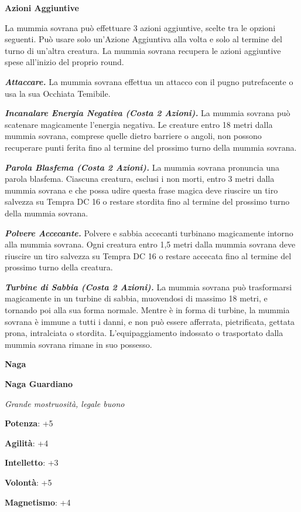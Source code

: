 \begin{multicols}{2}
\textbf{Azioni Aggiuntive}

La mummia sovrana può effettuare 3 azioni aggiuntive, scelte tra le
opzioni seguenti. Può usare solo un'Azione Aggiuntiva alla volta e
solo al termine del turno di un'altra creatura. La mummia sovrana
recupera le azioni aggiuntive spese all'inizio del proprio round.

\emph{\textbf{Attaccare.}} La mummia sovrana effettua un attacco con il
pugno putrefacente o usa la sua Occhiata Temibile.

\emph{\textbf{Incanalare Energia Negativa (Costa 2 Azioni).}} La mummia
sovrana può scatenare magicamente l'energia negativa. Le creature entro
18 metri dalla mummia sovrana, comprese quelle dietro barriere o angoli,
non possono recuperare punti ferita fino al termine del prossimo turno
della mummia sovrana.

\emph{\textbf{Parola Blasfema (Costa 2 Azioni).}} La mummia sovrana
pronuncia una parola blasfema. Ciascuna creatura, esclusi i non morti,
entro 3 metri dalla mummia sovrana e che possa udire questa frase magica
deve riuscire un tiro salvezza su Tempra DC 16 o restare stordita
fino al termine del prossimo turno della mummia sovrana.

\emph{\textbf{Polvere Accecante.}} Polvere e sabbia accecanti turbinano
magicamente intorno alla mummia sovrana. Ogni creatura entro 1,5 metri
dalla mummia sovrana deve riuscire un tiro salvezza su Tempra DC
16 o restare accecata fino al termine del prossimo turno della creatura.

\emph{\textbf{Turbine di Sabbia (Costa 2 Azioni).}} La mummia sovrana
può trasformarsi magicamente in un turbine di sabbia, muovendosi di
massimo 18 metri, e tornando poi alla sua forma normale. Mentre è in
forma di turbine, la mummia sovrana è immune a tutti i danni, e non può
essere afferrata, pietrificata, gettata prona, intralciata o stordita.
L'equipaggiamento indossato o trasportato dalla mummia sovrana rimane in
suo possesso.



\textbf{Naga}

\textbf{Naga Guardiano}

\emph{Grande mostruosità, legale buono}

\textbf{Potenza}: +5

\textbf{Agilità}: +4

\textbf{Intelletto}: +3

\textbf{Volontà}: +5

\textbf{Magnetismo}: +4


\end{multicols}
